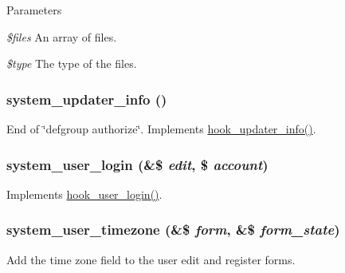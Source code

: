 \begin{DoxyParams}{Parameters}
\item[{\em \$files}]An array of files. \item[{\em \$type}]The type of the files. \end{DoxyParams}
\hypertarget{system_8module_a10c5077ea405b6e4e312291299687e75}{
\subsubsection[{system\_\-updater\_\-info}]{\setlength{\rightskip}{0pt plus 5cm}system\_\-updater\_\-info ()}}
\label{system_8module_a10c5077ea405b6e4e312291299687e75}
End of \char`\"{}defgroup authorize\char`\"{}. Implements \hyperlink{group__hooks_gafb9b375716a0ad02d35250dc252b3c99}{hook\_\-updater\_\-info()}. \hypertarget{system_8module_a4b41b351fd76cd41fe10c3ffe1e62504}{
\subsubsection[{system\_\-user\_\-login}]{\setlength{\rightskip}{0pt plus 5cm}system\_\-user\_\-login (\&\$ {\em edit}, \/  \$ {\em account})}}
\label{system_8module_a4b41b351fd76cd41fe10c3ffe1e62504}
Implements \hyperlink{group__hooks_ga8cce712a39ee6e57bd506b5a0c457d09}{hook\_\-user\_\-login()}. \hypertarget{system_8module_a087533e7ffcffe8c417f2e2ef12c6f62}{
\subsubsection[{system\_\-user\_\-timezone}]{\setlength{\rightskip}{0pt plus 5cm}system\_\-user\_\-timezone (\&\$ {\em form}, \/  \&\$ {\em form\_\-state})}}
\label{system_8module_a087533e7ffcffe8c417f2e2ef12c6f62}
Add the time zone field to the user edit and register forms. 